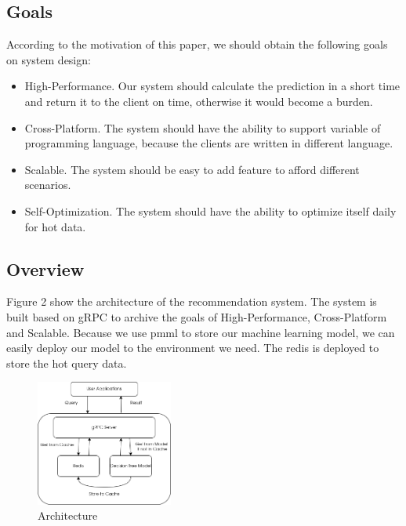 \documentclass[conference]{IEEEtran}
\begin{document}
\subsection{Goals}
According to the motivation of this paper, we should obtain the following goals
on system design:
\begin{itemize}
	\item High-Performance. Our system should calculate the prediction in a short time and return it to the client on time, otherwise it would become a burden.
	\item Cross-Platform. The system should have the ability to support variable of programming language, because the clients are written in different language.
	\item Scalable. The system should be easy to add feature to afford different scenarios.
	\item Self-Optimization. The system should have the ability to optimize itself daily for hot data.
\end{itemize}

\subsection{Overview}
Figure 2 show the architecture of the recommendation system. The system is built based on gRPC
to archive the goals of High-Performance, Cross-Platform and Scalable. Because we use pmml to store our machine learning model, we can easily deploy our model to the environment we need. The redis is deployed to store the hot query data.

\begin{figure}[htbp]
	\centering
	\includegraphics[width=0.4\textwidth]{architecture.png}
	\caption{Architecture}
\end{figure}
\end{document}
